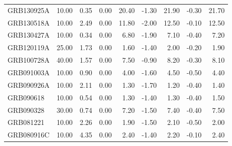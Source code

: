 \begin{tabular}{lrrrrrrrr}
GRB130925A & 10.00 & 0.35 & 0.00 & 20.40 & -1.30 & 21.90 & -0.30 & 21.70 \\
GRB130518A & 10.00 & 2.49 & 0.00 & 11.80 & -2.00 & 12.50 & -0.10 & 12.50 \\
GRB130427A & 10.00 & 0.34 & 0.00 & 6.80 & -1.90 & 7.10 & -0.40 & 7.20 \\
GRB120119A & 25.00 & 1.73 & 0.00 & 1.60 & -1.40 & 2.00 & -0.20 & 1.90 \\
GRB100728A & 40.00 & 1.57 & 0.00 & 7.50 & -0.90 & 8.20 & -0.30 & 8.10 \\
GRB091003A & 10.00 & 0.90 & 0.00 & 4.00 & -1.60 & 4.50 & -0.50 & 4.40 \\
GRB090926A & 10.00 & 2.11 & 0.00 & 1.30 & -1.70 & 1.20 & -0.40 & 1.40 \\
GRB090618 & 10.00 & 0.54 & 0.00 & 1.30 & -1.40 & 1.30 & -0.40 & 1.50 \\
GRB090328 & 30.00 & 0.74 & 0.00 & 7.20 & -1.50 & 7.40 & -0.40 & 7.50 \\
GRB081221 & 10.00 & 2.26 & 0.00 & 1.90 & -1.50 & 2.10 & -0.50 & 2.00 \\
GRB080916C & 10.00 & 4.35 & 0.00 & 2.40 & -1.40 & 2.20 & -0.10 & 2.40 \\
\bottomrule
\end{tabular}
